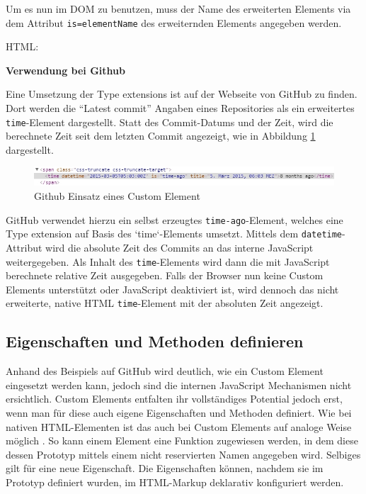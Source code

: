Um es nun im DOM zu benutzen, muss der Name des erweiterten Elements via dem Attribut \texttt{is=\dq elementName\dq} des erweiternden Elements angegeben werden.

HTML:
\begin{Shaded}
\begin{Highlighting}[]
\KeywordTok{>}
\end{Highlighting}
\end{Shaded}


\textbf{Verwendung bei Github}

Eine Umsetzung der Type extensions ist auf der Webseite von GitHub zu finden. Dort werden die ``Latest commit'' Angaben eines Repositories als ein erweitertes \texttt{time}-Element dargestellt. Statt des Commit-Datums und der Zeit, wird die berechnete Zeit seit dem letzten Commit angezeigt, wie in Abbildung \ref{fig:ghece} dargestellt.

\begin{figure}[htbp]
 \centering
 \includegraphics[width=\linewidth]{kapitel2/bilder/2-custom-elements-github-time-element}
 \caption{Github Einsatz eines Custom Element}
 \label{fig:ghece}
\end{figure}

GitHub verwendet hierzu ein selbst erzeugtes \texttt{time-ago}-Element, welches eine Type extension auf Basis des `time`-Elements umsetzt. Mittels dem \texttt{datetime}-Attribut wird die absolute Zeit des Commits an das interne JavaScript weitergegeben. Als Inhalt des \texttt{time}-Elements wird dann die mit JavaScript berechnete relative Zeit ausgegeben. Falls der Browser nun keine Custom Elements unterstützt oder JavaScript deaktiviert ist, wird dennoch das nicht erweiterte, native HTML \texttt{time}-Element mit der absoluten Zeit angezeigt.


\subsection{Eigenschaften und Methoden definieren}\label{eigenschaften-und-methoden-definieren}

Anhand des Beispiels auf GitHub wird deutlich, wie ein Custom Element eingesetzt werden kann, jedoch sind die internen JavaScript Mechanismen nicht ersichtlich. Custom Elements entfalten ihr vollständiges Potential jedoch erst, wenn man für diese auch eigene Eigenschaften und Methoden definiert. Wie bei nativen HTML-Elementen ist das auch bei Custom Elements auf analoge Weise möglich \cite{citeulike:13844975} . So kann einem Element eine Funktion zugewiesen werden, in dem diese dessen Prototyp mittels einem nicht reservierten Namen angegeben wird. Selbiges gilt für eine neue Eigenschaft. Die Eigenschaften können, nachdem sie im Prototyp definiert wurden, im HTML-Markup deklarativ konfiguriert werden.

